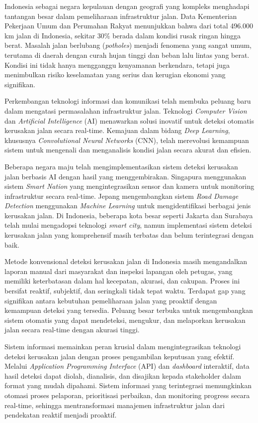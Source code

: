\documentclass[12pt,a4paper]{report}
\begin{document}
Indonesia sebagai negara kepulauan dengan geografi yang kompleks menghadapi tantangan besar dalam pemeliharaan infrastruktur jalan. Data Kementerian Pekerjaan Umum dan Perumahan Rakyat menunjukkan bahwa dari total 496.000 km jalan di Indonesia, sekitar 30\% berada dalam kondisi rusak ringan hingga berat. Masalah jalan berlubang (\textit{potholes}) menjadi fenomena yang sangat umum, terutama di daerah dengan curah hujan tinggi dan beban lalu lintas yang berat. Kondisi ini tidak hanya mengganggu kenyamanan berkendara, tetapi juga menimbulkan risiko keselamatan yang serius dan kerugian ekonomi yang signifikan.

Perkembangan teknologi informasi dan komunikasi telah membuka peluang baru dalam mengatasi permasalahan infrastruktur jalan. Teknologi \textit{Computer Vision} dan \textit{Artificial Intelligence} (AI) menawarkan solusi inovatif untuk deteksi otomatis kerusakan jalan secara real-time. Kemajuan dalam bidang \textit{Deep Learning}, khususnya \textit{Convolutional Neural Networks} (CNN), telah merevolusi kemampuan sistem untuk mengenali dan menganalisis kondisi jalan secara akurat dan efisien.

Beberapa negara maju telah mengimplementasikan sistem deteksi kerusakan jalan berbasis AI dengan hasil yang menggembirakan. Singapura menggunakan sistem \textit{Smart Nation} yang mengintegrasikan sensor dan kamera untuk monitoring infrastruktur secara real-time. Jepang mengembangkan sistem \textit{Road Damage Detection} menggunakan \textit{Machine Learning} untuk mengidentifikasi berbagai jenis kerusakan jalan. Di Indonesia, beberapa kota besar seperti Jakarta dan Surabaya telah mulai mengadopsi teknologi \textit{smart city}, namun implementasi sistem deteksi kerusakan jalan yang komprehensif masih terbatas dan belum terintegrasi dengan baik.

Metode konvensional deteksi kerusakan jalan di Indonesia masih mengandalkan laporan manual dari masyarakat dan inspeksi lapangan oleh petugas, yang memiliki keterbatasan dalam hal kecepatan, akurasi, dan cakupan. Proses ini bersifat reaktif, subjektif, dan seringkali tidak tepat waktu. Terdapat gap yang signifikan antara kebutuhan pemeliharaan jalan yang proaktif dengan kemampuan deteksi yang tersedia. Peluang besar terbuka untuk mengembangkan sistem otomatis yang dapat mendeteksi, mengukur, dan melaporkan kerusakan jalan secara real-time dengan akurasi tinggi.

Sistem informasi memainkan peran krusial dalam mengintegrasikan teknologi deteksi kerusakan jalan dengan proses pengambilan keputusan yang efektif. Melalui \textit{Application Programming Interface} (API) dan \textit{dashboard} interaktif, data hasil deteksi dapat diolah, dianalisis, dan disajikan kepada stakeholder dalam format yang mudah dipahami. Sistem informasi yang terintegrasi memungkinkan otomasi proses pelaporan, prioritisasi perbaikan, dan monitoring progress secara real-time, sehingga mentransformasi manajemen infrastruktur jalan dari pendekatan reaktif menjadi proaktif.
\end{document}
